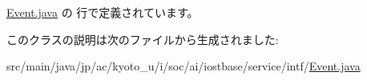  \hyperlink{service_2intf_2_event_8java_source}{Event.\-java} の  行で定義されています。



このクラスの説明は次のファイルから生成されました\-:\begin{DoxyCompactItemize}
\item 
src/main/java/jp/ac/kyoto\-\_\-u/i/soc/ai/iostbase/service/intf/\hyperlink{service_2intf_2_event_8java}{Event.\-java}\end{DoxyCompactItemize}
